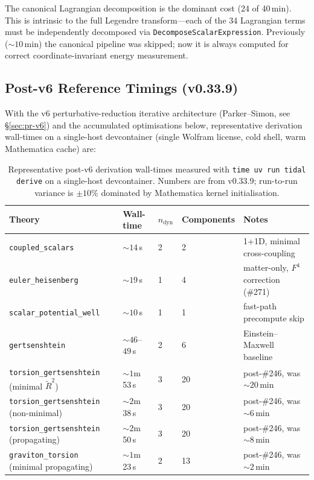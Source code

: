 The canonical Lagrangian decomposition is the dominant cost (24 of 40\,min). This is intrinsic to the full Legendre transform---each of the 34 Lagrangian terms must be independently decomposed via \texttt{DecomposeScalarExpression}. Previously (${\sim}10$\,min) the canonical pipeline was skipped; now it is always computed for correct coordinate-invariant energy measurement.

\subsection{Post-v6 Reference Timings (v0.33.9)}
\label{sec:post-v6-timings}

With the v6 perturbative-reduction iterative architecture (Parker--Simon, see \S\ref{sec:pr-v6}) and the accumulated optimisations below, representative derivation wall-times on a single-host devcontainer (single Wolfram license, cold shell, warm Mathematica cache) are:

\begin{table}[htbp]
\centering
\caption{Representative post-v6 derivation wall-times measured with \texttt{time uv run tidal derive} on a single-host devcontainer. Numbers are from v0.33.9; run-to-run variance is $\pm 10\%$ dominated by Mathematica kernel initialisation.}
\label{tab:post-v6-timings}
\begin{tabular}{@{}lllll@{}}
\toprule
Theory & Wall-time & $n_{\mathrm{dyn}}$ & Components & Notes \\
\midrule
\texttt{coupled\_scalars}                     & ${\sim}14$\,s    & 2 & 2  & 1+1D, minimal cross-coupling \\
\texttt{euler\_heisenberg}                    & ${\sim}19$\,s    & 1 & 4  & matter-only, $F^4$ correction (\#271) \\
\texttt{scalar\_potential\_well}              & ${\sim}10$\,s    & 1 & 1  & fast-path precompute skip \\
\texttt{gertsenshtein}                        & ${\sim}46$--$49$\,s & 2 & 6 & Einstein--Maxwell baseline \\
\texttt{torsion\_gertsenshtein} (minimal $\tilde{R}^2$) & ${\sim}1$m\,53\,s  & 3 & 20 & post-\#246, was ${\sim}20$\,min \\
\texttt{torsion\_gertsenshtein} (non-minimal) & ${\sim}2$m\,38\,s  & 3 & 20 & post-\#246, was ${\sim}6$\,min \\
\texttt{torsion\_gertsenshtein} (propagating) & ${\sim}2$m\,50\,s  & 3 & 20 & post-\#246, was ${\sim}8$\,min \\
\texttt{graviton\_torsion} (minimal propagating) & ${\sim}1$m\,23\,s  & 2 & 13 & post-\#246, was ${\sim}2$\,min \\
\bottomrule
\end{tabular}
\end{table}

